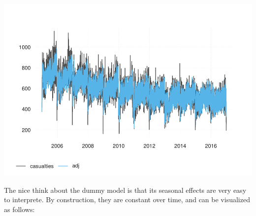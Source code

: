 \begin{Schunk}

\includegraphics[width=1\linewidth]{overview_files/figure-latex/arimax-1} \end{Schunk}

The nice think about the dummy model is that its seasonal effects are
very easy to interprete. By construction, they are constant over time,
and can be visualized as follows:

